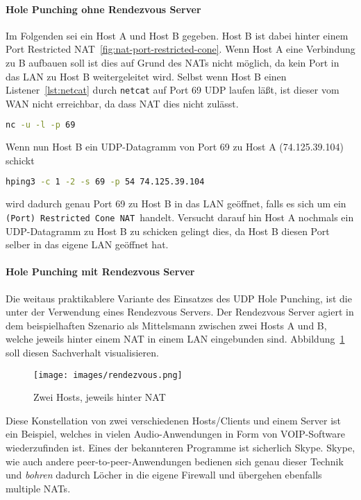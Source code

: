 \paragraph{Hole Punching ohne Rendezvous Server}
Im Folgenden sei ein Host A und Host B gegeben. Host B ist dabei
hinter einem Port Restricted NAT~\ref{fig:nat-port-restricted-cone}.
Wenn Host A eine Verbindung zu B aufbauen soll ist dies auf Grund des
NATs nicht möglich, da kein Port in das LAN zu Host B weitergeleitet
wird. Selbst wenn Host B einen Listener~\ref{lst:netcat} durch
\texttt{netcat} auf Port 69 UDP laufen läßt, ist dieser vom WAN nicht
erreichbar, da dass NAT dies nicht zulässt.

\begin{lstlisting}[language=bash]
nc -u -l -p 69
\end{lstlisting}
\label{lst:netcat}

Wenn nun Host B ein UDP-Datagramm von Port 69 zu Host A
(74.125.39.104) schickt
\begin{lstlisting}[language=bash]
hping3 -c 1 -2 -s 69 -p 54 74.125.39.104
\end{lstlisting}
\label{lst:hping}
wird dadurch genau Port 69 zu Host B in das LAN geöffnet, falls es
sich um ein \texttt{(Port) Restricted Cone NAT }handelt.  Versucht
darauf hin Host A nochmals ein UDP-Datagramm zu Host B zu schicken
gelingt dies, da Host B diesen Port selber in das eigene LAN geöffnet
hat.

\paragraph{Hole Punching mit Rendezvous Server}
\label{sec:hole-rendezvous}
Die weitaus praktikablere Variante des Einsatzes des UDP Hole
Punching, ist die unter der Verwendung eines Rendezvous Servers.  Der
Rendezvous Server agiert in dem beispielhaften Szenario als
Mittelsmann zwischen zwei Hosts A und B, welche jeweils hinter einem
NAT in einem LAN eingebunden sind. Abbildung~\ref{fig:rendezvous} soll
diesen Sachverhalt visualisieren.

\begin{figure}
  \centering
  \texttt{[image: images/rendezvous.png]}
  \caption{Zwei Hosts, jeweils hinter NAT}
  \label{fig:rendezvous}
\end{figure}

Diese Konstellation von zwei verschiedenen Hosts/Clients und einem
Server ist ein Beispiel, welches in vielen Audio-Anwendungen in Form
von VOIP-Software wiederzufinden ist. Eines der bekannteren Programme
ist sicherlich Skype.  Skype, wie auch andere peer-to-peer-Anwendungen
bedienen sich genau dieser Technik und \textit{bohren} dadurch Löcher
in die eigene Firewall und übergehen ebenfalls multiple NATs.

